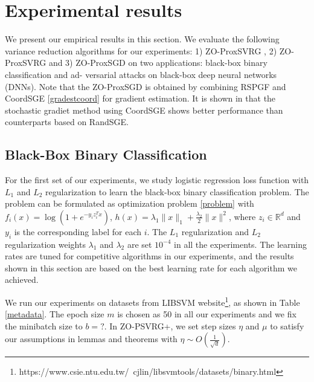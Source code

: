 \documentclass{article}
\newcommand*{\R}{\mathbb{R}}
\theoremstyle{definition}
\theoremstyle{remark}
\begin{document}
\section{Experimental results}

We present our empirical results in this section. We evaluate the following variance reduction algorithms for our experiments: 1) ZO-ProxSVRG \cite{Johnson12}, 2) ZO-ProxSVRG\cite{pedregosa2017breaking} and 3) ZO-ProxSGD on two applications: black-box binary classification and ad-
versarial attacks on black-box deep neural networks
(DNNs). Note that the ZO-ProxSGD is obtained by combining RSPGF and CoordSGE \eqref{gradestcoord} for gradient estimation. It is shown in \cite{huang2019faster} that the stochastic gradiet method using CoordSGE shows better performance than counterparts based on RandSGE.


\subsection{Black-Box Binary Classification}
For the first set of our experiments, we study logistic regression loss function with $L_1$ and $L_2$ regularization {\color{Green} to learn the black-box binary classification problem}. The problem can be formulated as optimization problem \eqref{problem} with $f_i(x) = \log(1+e^{-y_iz^T_i{x}})$, $h(x) = \lambda_1\|{x}\|_1 + \frac{\lambda_2}{2}\|{x}\|^2$, where $z_i\in\R^d$ and $y_i$ is the corresponding label for each $i$. The $L_1$ regularization and $L_2$ regularization weights $\lambda_1$ and $\lambda_2$ are set $10^{-4}$ in all the experiments. The learning rates are tuned for competitive algorithms in our experiments, and the results shown in this section are based on the best learning rate for each algorithm we achieved.


We run our experiments on datasets from LIBSVM website{\footnote{https://www.csie.ntu.edu.tw/~cjlin/libsvmtools/datasets/binary.html}}, as shown in Table \ref{metadata}. The epoch size $m$ is chosen as {\color{red} 50} in all our experiments and we fix the minibatch size to $b = ?$. In ZO-PSVRG+, we set step sizes $\eta$ and $\mu$ to satisfy our assumptions in lemmas and theorems with $\eta\sim O(\frac{1}{\sqrt{d}})$.
\end{document}
